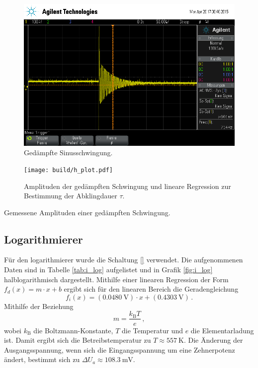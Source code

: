\begin{figure}[!h]
    \centering
    \includegraphics[width=0.8\linewidth]{data/scope_18.png}
    \caption{Gedämpfte Sinusschwingung.}
    \label{fig:ged_sinus}
\end{figure}

\begin{figure}[!h]
    \centering
    \texttt{[image: build/h\_plot.pdf]}
    \caption{Amplituden der gedämpften Schwingung und lineare Regression zur Bestimmung der Abklingdauer $\tau$.}
    \label{fig:ged_schwing}
\end{figure}

\begin{table}[!h]
    \centering
    \caption{Gemessene Amplituden einer gedämpften Schwingung.}
    \label{tab:ged_schwing}
    

\end{table}

\subsection{Logarithmierer} %
\label{sub:logarithmierer}

Für den logarithmierer wurde die Schaltung \ref{} verwendet.
Die aufgenommenen Daten sind in Tabelle \ref{tab:i_log} aufgelistet und in Grafik \ref{fig:i_log} halblogarithmisch dargestellt.
Mithilfe einer linearen Regression der Form $f_{d}(x) = m \cdot x + b$ ergibt sich für den linearen Bereich die Geradengleichung
\begin{equation*}
    f_{i}(x) = (\SI{0.0480}{\volt}) \cdot x + (\SI{0.4303}{\volt})\,.
\end{equation*}
Mithilfe der Beziehung
\begin{equation*}
    m = \frac{k_\mathrm{B} T}{e}\,,
\end{equation*}
wobei $k_\mathrm{B}$ die Boltzmann-Konstante, $T$ die Temperatur und $e$ die Elementarladung ist.
Damit ergibt sich die Betreibstemperatur zu $T \approx \SI{557}{\kelvin}$.
Die Änderung der Ausgangsspannung, wenn sich die Eingangsspannung um eine Zehnerpotenz ändert, bestimmt sich zu $\Delta U_a \approx \SI{108.3}{\milli\volt}$.

